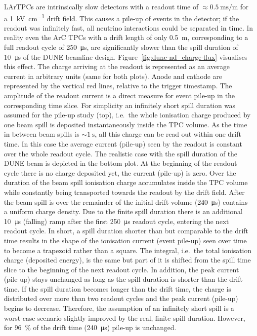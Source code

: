 \documentclass[a4paper]{article}
\begin{document}
LArTPCs are intrinsically slow detectors with a readout time of $\approx \SI{0.5}{\milli\second\per\metre}$ for a \SI{1}{\kilo\volt\per\centi\metre} drift field.
This causes a pile-up of events in the detector; if the readout was infinitely fast, all neutrino interactions could be separated in time.
In reality even the ArC TPCs with a drift length of only \SI{0.5}{\metre}, corresponding to a full readout cycle of \SI{250}{\micro\second}, are significantly slower than the spill duration of \SI{10}{\micro\second} of the DUNE beamline design.
Figure~\ref{fig:dune-nd_charge-flux} visualises this effect.
The charge arriving at the readout is represented as an average current in arbitrary units (same for both plots).
Anode and cathode are represented by the vertical red lines, relative to the trigger timestamp.
The amplitude of the readout current is a direct measure for event pile-up in the corresponding time slice.
For simplicity an infinitely short spill duration was assumed for the pile-up study (top), i.e.\ the whole ionisation charge produced by one beam spill is deposited instantaneously inside the TPC volume.
As the time in between beam spills is $\sim{\SI{1}{\second}}$, all this charge can be read out within one drift time.
In this case the average current (pile-up) seen by the readout is constant over the whole readout cycle.
The realistic case with the spill duration of the DUNE beam is depicted in the bottom plot.
At the beginning of the readout cycle there is no charge deposited yet, the current (pile-up) is zero.
Over the duration of the beam spill ionisation charge accumulates inside the TPC volume while constantly being transported towards the readout by the drift field.
After the beam spill is over the remainder of the initial drift volume (\SI{240}{\micro\second}) contains a uniform charge density.
Due to the finite spill duration there is an additional \SI{10}{\micro\second} (falling) ramp after the first \SI{250}{\micro\second} readout cycle, entering the next readout cycle.
In short, a spill duration shorter than but comparable to the drift time results in the shape of the ionisation current (event pile-up) seen over time to become a trapezoid rather than a square.
The integral, i.e.\ the total ionisation charge (deposited energy), is the same but part of it is shifted from the spill time slice to the beginning of the next readout cycle.
In addition, the peak current (pile-up) stays unchanged as long as the spill duration is shorter than the drift time.
If the spill duration becomes longer than the drift time, the charge is distributed over more than two readout cycles and the peak current (pile-up) begins to decrease.
Therefore, the assumption of an infinitely short spill is a worst-case scenario slightly improved by the real, finite spill duration.
However, for \SI{96}{\percent} of the drift time (\SI{240}{\micro\second}) pile-up is unchanged.
\end{document}
